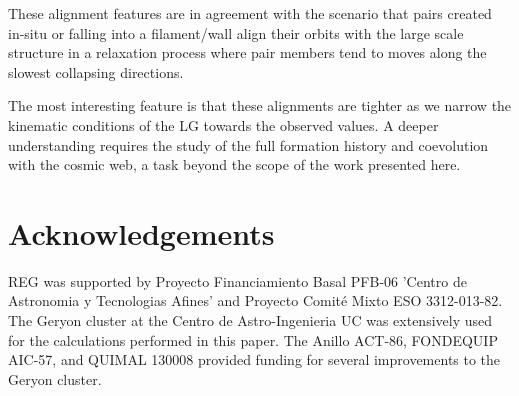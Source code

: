 \documentclass{emulateapj}
\begin{document}
These alignment features are in agreement with the scenario that pairs 
created in-situ or falling into a filament/wall align their orbits with 
the large scale structure in a relaxation process where pair members
tend to moves along the slowest collapsing directions.

The most interesting feature is that these alignments are
tighter as we narrow the kinematic conditions of the LG towards the
observed values. A deeper understanding requires the study of the full
formation history and coevolution with the cosmic web, a task beyond
the scope of the work presented here.




\section*{Acknowledgements}
REG was supported by Proyecto Financiamiento Basal PFB-06 'Centro de Astronomia y Tecnologias Afines' and Proyecto Comit\'e Mixto ESO 3312-013-82.
The Geryon cluster at the Centro de Astro-Ingenieria UC was extensively used for the calculations performed in this paper. The Anillo ACT-86, FONDEQUIP AIC-57, and QUIMAL 130008 provided funding for several improvements to the Geryon cluster.


 
\end{document}
